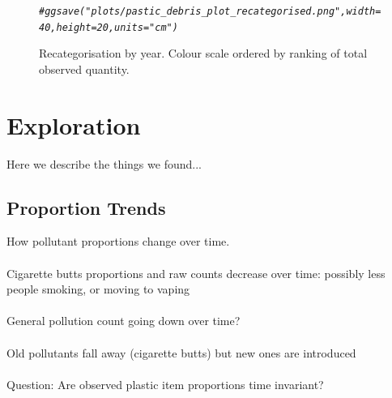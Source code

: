 \documentclass[10pt]{article}\usepackage[]{graphicx}\usepackage[]{color}
\makeatletter
\newcommand{\hlcom}[1]{\textcolor[rgb]{0.678,0.584,0.686}{\textit{#1}}}%
\newenvironment{kframe}{%
 \def\at@end@of@kframe{}%
 \ifinner\ifhmode%
  \def\at@end@of@kframe{\end{minipage}}%
  \begin{minipage}{\columnwidth}%
 \fi\fi%
 \def\FrameCommand##1{\hskip\@totalleftmargin \hskip-\fboxsep
 \colorbox{shadecolor}{##1}\hskip-\fboxsep
     \hskip-\linewidth \hskip-\@totalleftmargin \hskip\columnwidth}%
 \MakeFramed {\advance\hsize-\width
   \@totalleftmargin\z@ \linewidth\hsize
   \@setminipage}}%
 {\par\unskip\endMakeFramed%
 \at@end@of@kframe}
\newenvironment{knitrout}{}{} %
\makeatother
\begin{document}
\begin{figure}[H]
\begin{center}
\begin{knitrout}
\begin{kframe}\begin{alltt}
\hlcom{#ggsave("plots/pastic_debris_plot_recategorised.png", width = 40, height = 20, units = "cm")}
\end{alltt}
\end{kframe}
\end{knitrout}
\caption {Recategorisation by year. Colour scale ordered by ranking of total observed quantity.}
\label{figB}
\end {center}
\end {figure}



\pagebreak
\section{Exploration}

Here we describe the things we found... 

\subsection{Proportion Trends}
How pollutant proportions change over time.\\
\\
Cigarette butts proportions and raw counts decrease over time: possibly less people smoking, or moving to vaping\\
\\
General pollution count going down over time?\\
\\
Old pollutants fall away (cigarette butts) but new ones are introduced\\
\\
Question: Are observed plastic item proportions time invariant?\\
\\
\end{document}
